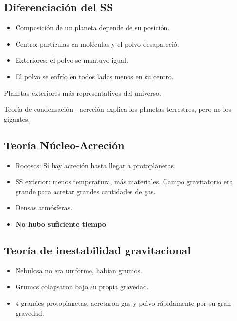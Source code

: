 \documentclass[11pt,fleqn]{book} %
\begin{document}
\subsection{Diferenciación del SS}
\begin{itemize}
    \item Composición de un planeta depende de su posición. 
    \item Centro: partículas en moléculas y el polvo desapareció.
    \item Exteriores: el polvo se mantuvo igual. 
    \item El polvo se enfrío en todos lados menos en su centro. 
\end{itemize}

\begin{remark}
Planetas exteriores más representativos del universo.
\end{remark}

\begin{notation}
Teoría de condensación - acreción explica los planetas terrestres, pero no los gigantes. 
\end{notation}

\subsection{Teoría Núcleo-Acreción}
\begin{itemize}
    \item Rocosos: Sí hay acreción hasta llegar a protoplanetas. 
    \item SS exterior: menos temperatura, más materiales. Campo gravitatorio era grande para acretar grandes cantidades de gas. 
    \item Densas atmósferas. 
    \item \textbf{No hubo suficiente tiempo}
\end{itemize}

\subsection{Teoría de inestabilidad gravitacional}
\begin{itemize}
    \item Nebulosa no era uniforme, habían grumos. 
    \item Grumos colapsaron bajo su propia gravedad. 
    \item 4 grandes protoplanetas, acretaron gas y polvo rápidamente por su gran gravedad. 
\end{itemize}
\end{document}
